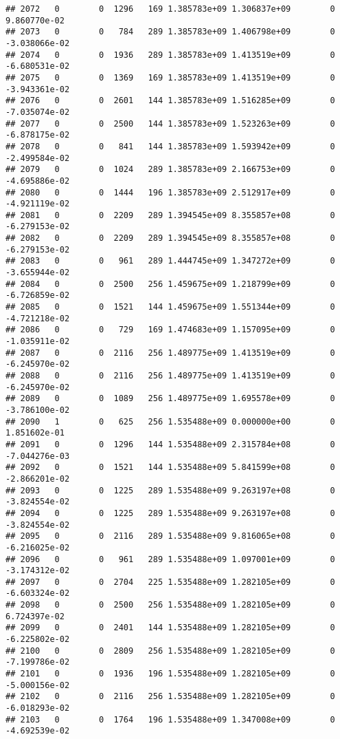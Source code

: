 \documentclass[
]{article}
\begin{document}
\begin{enumerate}
\begin{verbatim}
## 2072   0        0  1296   169 1.385783e+09 1.306837e+09        0  9.860770e-02
## 2073   0        0   784   289 1.385783e+09 1.406798e+09        0 -3.038066e-02
## 2074   0        0  1936   289 1.385783e+09 1.413519e+09        0 -6.680531e-02
## 2075   0        0  1369   169 1.385783e+09 1.413519e+09        0 -3.943361e-02
## 2076   0        0  2601   144 1.385783e+09 1.516285e+09        0 -7.035074e-02
## 2077   0        0  2500   144 1.385783e+09 1.523263e+09        0 -6.878175e-02
## 2078   0        0   841   144 1.385783e+09 1.593942e+09        0 -2.499584e-02
## 2079   0        0  1024   289 1.385783e+09 2.166753e+09        0 -4.695886e-02
## 2080   0        0  1444   196 1.385783e+09 2.512917e+09        0 -4.921119e-02
## 2081   0        0  2209   289 1.394545e+09 8.355857e+08        0 -6.279153e-02
## 2082   0        0  2209   289 1.394545e+09 8.355857e+08        0 -6.279153e-02
## 2083   0        0   961   289 1.444745e+09 1.347272e+09        0 -3.655944e-02
## 2084   0        0  2500   256 1.459675e+09 1.218799e+09        0 -6.726859e-02
## 2085   0        0  1521   144 1.459675e+09 1.551344e+09        0 -4.721218e-02
## 2086   0        0   729   169 1.474683e+09 1.157095e+09        0 -1.035911e-02
## 2087   0        0  2116   256 1.489775e+09 1.413519e+09        0 -6.245970e-02
## 2088   0        0  2116   256 1.489775e+09 1.413519e+09        0 -6.245970e-02
## 2089   0        0  1089   256 1.489775e+09 1.695578e+09        0 -3.786100e-02
## 2090   1        0   625   256 1.535488e+09 0.000000e+00        0  1.851602e-01
## 2091   0        0  1296   144 1.535488e+09 2.315784e+08        0 -7.044276e-03
## 2092   0        0  1521   144 1.535488e+09 5.841599e+08        0 -2.866201e-02
## 2093   0        0  1225   289 1.535488e+09 9.263197e+08        0 -3.824554e-02
## 2094   0        0  1225   289 1.535488e+09 9.263197e+08        0 -3.824554e-02
## 2095   0        0  2116   289 1.535488e+09 9.816065e+08        0 -6.216025e-02
## 2096   0        0   961   289 1.535488e+09 1.097001e+09        0 -3.174312e-02
## 2097   0        0  2704   225 1.535488e+09 1.282105e+09        0 -6.603324e-02
## 2098   0        0  2500   256 1.535488e+09 1.282105e+09        0  6.724397e-02
## 2099   0        0  2401   144 1.535488e+09 1.282105e+09        0 -6.225802e-02
## 2100   0        0  2809   256 1.535488e+09 1.282105e+09        0 -7.199786e-02
## 2101   0        0  1936   196 1.535488e+09 1.282105e+09        0 -5.000156e-02
## 2102   0        0  2116   256 1.535488e+09 1.282105e+09        0 -6.018293e-02
## 2103   0        0  1764   196 1.535488e+09 1.347008e+09        0 -4.692539e-02

\end{verbatim}
\end{enumerate}
\end{document}
